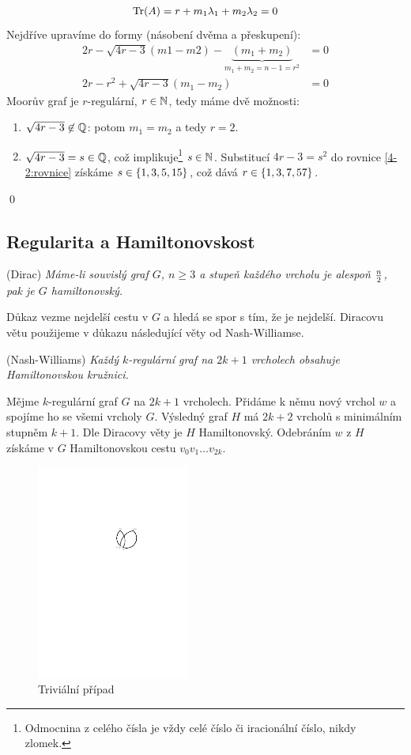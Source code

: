 \begin{align}
	\operatorname{Tr}(A) = r+m_1\lambda_1 + m_2\lambda_2 = 0
\end{align}
Nejdříve
upravíme do formy (násobení dvěma a přeskupení):
\begin{align}
	2r - \sqrt{4r-3}(m1-m2) - \underbrace{(m_1+m_2)}_{m_1+m_2=n-1=r^2} &= 0\\
	2r - r^2 + \sqrt{4r-3}(m_1 - m_2) &= 0 
	\label{4-2:rovnice}
\end{align}
Moorův graf je $r$-regulární, $r\in\mathbb{N}$, tedy máme dvě možnosti:
\begin{enumerate}
	\item $\sqrt{4r-3} \not\in \mathbb{Q}$: potom $m_1 = m_2$ a tedy $r = 2$.
	\item $\sqrt{4r-3} = s \in \mathbb{Q}$, což implikuje\footnote{Odmocnina z celého čísla je
  vždy celé číslo či iracionální číslo, nikdy zlomek.} $s \in \mathbb{N}$.
  Substitucí $4r - 3 = s^2$ do rovnice \ref{4-2:rovnice} získáme
	$s \in \{1, 3, 5, 15\}$, což dává $r \in \{1, 3, 7, 57\}$.
\end{enumerate}
\qed


\subsection{Regularita a Hamiltonovskost}
\vt (Dirac) {\it Máme-li souvislý graf $G$, $n \ge 3$ a stupeň každého vrcholu je alespoň $n\over 2$, pak je $G$ hamiltonovský.} 

Důkaz vezme nejdelší cestu v $G$ a hledá se spor s tím, že je nejdelší. Diracovu větu použijeme v důkazu následující věty od Nash-Williamse. 

\vt (Nash-Williams) {\it Každý $k$-regulární graf na $2k+1$ vrcholech obsahuje Hamiltonovskou kružnici.}

\dk Mějme $k$-regulární graf $G$ na $2k+1$ vrcholech. Přidáme k němu nový vrchol $w$ a spojíme ho se všemi vrcholy $G$. Výsledný graf $H$ má $2k+2$ vrcholů s minimálním stupněm $k+1$. Dle Diracovy věty je $H$ Hamiltonovský. Odebráním $w$ z $H$ získáme v $G$ Hamiltonovskou cestu $v_0v_1\dots v_{2k}$.

\begin{figure}
\centering
\includegraphics[width=5cm]{img/nash-williams4.pdf}
\caption{Triviální případ}
\label{dk:nw-triv}
\end{figure}

